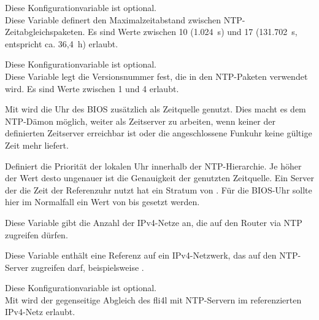 \begin{description}

  Diese Konfigurationvariable ist optional.\\
  Diese Variable definert den Maximalzeitabstand zwischen
  NTP-Zeitabgleichspaketen. Es sind Werte zwischen 10 (1.024~s) und 17
  (131.702~s, entspricht ca. 36,4~h) erlaubt.


  Diese Konfigurationvariable ist optional.\\
  Diese Variable legt die Versionsnummer fest, die in den NTP-Paketen verwendet
  wird. Es sind Werte zwischen 1 und 4 erlaubt.


  Mit  wird die Uhr des BIOS zusätzlich als Zeitquelle genutzt.
  Dies macht es dem NTP-Dämon möglich, weiter als Zeitserver zu arbeiten, wenn
  keiner der definierten Zeitserver erreichbar ist oder die angeschlossene 
  Funkuhr keine gültige Zeit mehr liefert.


  Definiert die Priorität der lokalen Uhr innerhalb der NTP-Hierarchie.
  Je höher der Wert desto ungenauer ist die Genauigkeit der genutzten
  Zeitquelle. Ein Server der die Zeit der Referenzuhr nutzt hat ein Stratum von
  . Für die BIOS-Uhr sollte hier im Normalfall ein Wert von 
  bis  gesetzt werden.


  Diese Variable gibt die Anzahl der IPv4-Netze an, die auf den Router via NTP
  zugreifen dürfen.
  

  Diese Variable enthält eine Referenz auf ein IPv4-Netzwerk, das auf den
  NTP-Server zugreifen darf, beispielsweise .


  Diese Konfigurationvariable ist optional.\\
  Mit  wird der gegenseitige Abgleich des fli4l mit NTP-Servern
  im referenzierten IPv4-Netz erlaubt.


\end{description}
